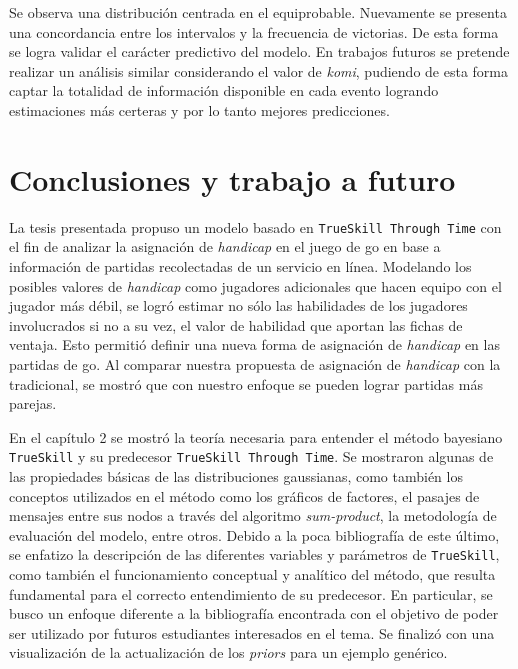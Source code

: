 \documentclass[11pt,twoside,spanish]{report} %
\begin{document}
Se observa una distribuci\'on centrada en el equiprobable.
Nuevamente se presenta una concordancia entre los intervalos y la frecuencia de victorias.
De esta forma se logra validar el car\'acter predictivo del modelo.
En trabajos futuros se pretende realizar un an\'alisis similar considerando el valor de \textit{komi}, pudiendo de esta forma captar la totalidad de informaci\'on disponible en cada evento logrando estimaciones m\'as certeras y por lo tanto mejores predicciones.


\chapter{Conclusiones y trabajo a futuro}


La tesis presentada propuso un modelo basado en \texttt{TrueSkill Through Time} con el fin de analizar la asignaci\'on de \textit{handicap} en el juego de go en base a informaci\'on de partidas recolectadas de un servicio en l\'inea.
Modelando los posibles valores  de \textit{handicap} como jugadores adicionales que hacen equipo con el jugador m\'as d\'ebil, se logr\'o estimar no s\'olo las habilidades de los jugadores involucrados si no a su vez, el valor de habilidad que aportan las fichas de ventaja. 
Esto permiti\'o definir una nueva forma de asignaci\'on de \textit{handicap} en las partidas de go.
Al comparar nuestra propuesta de asignaci\'on de \textit{handicap} con la tradicional, se mostr\'o que con nuestro enfoque se pueden lograr partidas m\'as parejas. 

En el cap\'itulo 2 se mostr\'o la teor\'ia necesaria para entender el m\'etodo bayesiano  \texttt{TrueSkill} y  su predecesor \texttt{TrueSkill Through Time}.
Se mostraron algunas de las propiedades b\'asicas de las distribuciones gaussianas, como tambi\'en los conceptos utilizados en el m\'etodo como los gr\'aficos de factores, el pasajes de mensajes entre sus nodos a trav\'es del algoritmo \textit{sum-product}, la metodolog\'ia de evaluaci\'on del modelo, entre otros.
Debido a la poca bibliograf\'ia de este \'ultimo, se enfatizo la descripci\'on de las diferentes variables y par\'ametros de \texttt{TrueSkill}, como tambi\'en el funcionamiento conceptual y anal\'itico del m\'etodo, que resulta fundamental para el correcto entendimiento de su predecesor.
En particular, se busco un enfoque diferente a la bibliograf\'ia encontrada con el objetivo de poder ser utilizado por futuros estudiantes interesados en el tema.
Se finaliz\'o con una visualizaci\'on de la actualizaci\'on de los \textit{priors} para un ejemplo gen\'erico. 
\end{document}
